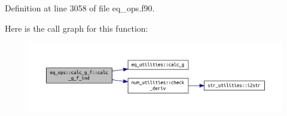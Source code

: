 Definition at line 3058 of file eq\+\_\+ops.\+f90.

Here is the call graph for this function\+:\nopagebreak
\begin{figure}[H]
\begin{center}
\leavevmode
\includegraphics[width=350pt]{interfaceeq__ops_1_1calc__g__f_a2c6ba8f85bc6ab16e69d4ec2ccaa317a_cgraph}
\end{center}
\end{figure}


